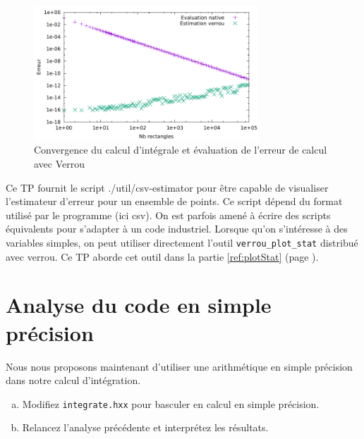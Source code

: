 \documentclass[a4paper]{article}
\newcounter{Question}
\newenvironment{question}[1][\unskip]{
  \bigskip
  \stepcounter{Question}
  \def\questionTitle{ #1}
  \begin{mdframed}[style=question]
  }{
  \end{mdframed}
}
\newenvironment{warn}[1][Attention :]{
  \begin{mdframed}[style=warning]
    \noindent{\bf #1}
}{
  \end{mdframed}
}
\begin{document}
\begin{figure}[htbp]
  \centering
  \includegraphics[width=0.75\textwidth]{cvPlot_11.pdf}
  \caption{Convergence du calcul d'intégrale et évaluation de l'erreur de calcul
  avec Verrou}
  \label{fig:cvplot_11}
\end{figure}

\begin{warn}
  Ce TP fournit le script ./util/csv-estimator pour être capable de visualiser
  l'estimateur d'erreur pour un ensemble de points. Ce script dépend du format
  utilisé par le programme (ici csv). On est parfois amené à écrire des scripts
  équivalents pour s'adapter à un code industriel. Lorsque qu'on s'intéresse à
  des variables simples, on peut utiliser directement l'outil
  \texttt{verrou\_plot\_stat} distribué avec verrou. Ce TP aborde cet outil
  dans la partie \ref{ref:plotStat} (page \pageref{ref:plotStat}).
  
\end{warn}



\section{Analyse du code en simple précision}
\label{ref:AnalyseSimple}

Nous nous proposons maintenant d'utiliser une arithmétique en simple précision
dans notre calcul d'intégration.

\begin{question}
  \begin{enumerate}[(a)]
  \item Modifiez \texttt{integrate.hxx} pour basculer en calcul en simple
    précision.
  \item Relancez l'analyse précédente et interprétez les résultats.
  \end{enumerate}
\end{question}
\end{document}
